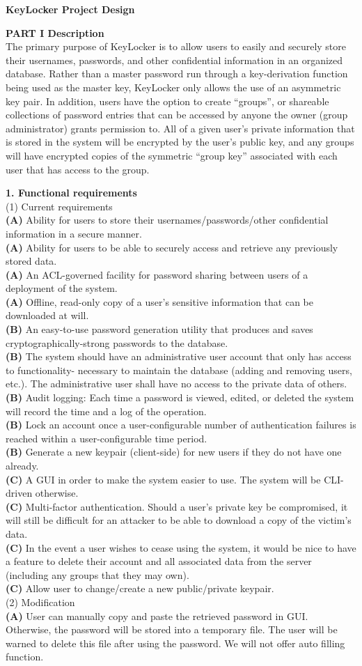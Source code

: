 \documentclass[11pt, letterpaper]{article}
\newcommand{\DesignSection}[1]
{\noindent\textbf{#1}\\}
\newcommand{\IndentBullet}[1]
{\indent\textbullet{} #1\\}
\begin{document}
\centerline{\textbf{KeyLocker Project Design}}
\smallskip

\DesignSection{PART I Description}
\noindent
The primary purpose of KeyLocker is to allow users to easily and securely store their usernames, passwords, and other confidential information in an organized database. Rather than a master password run through a key-derivation function being used as the master key, KeyLocker only allows the use of an asymmetric key pair. In addition, users have the option to create “groups”, or shareable collections of password entries that can be accessed by anyone the owner (group administrator) grants permission to. All of a given user's private information that is stored in the system will be encrypted by the user's public key, and any groups will have encrypted copies of the symmetric “group key” associated with each user that has access to the group.

\DesignSection{1. Functional requirements}
\smallskip
\noindent(1) Current requirements\\
\IndentBullet{\textbf{(A) }Ability for users to store their usernames/passwords/other confidential information in a secure manner.}
\IndentBullet{\textbf{(A) }Ability for users to be able to securely access and retrieve any previously stored data.}
\IndentBullet{\textbf{(A) }An ACL-governed facility for password sharing between users of a deployment of the system.}
\IndentBullet{\textbf{(A) }Offline, read-only copy of a user's sensitive information that can be downloaded at will.}
\IndentBullet{\textbf{(B) }An easy-to-use password generation utility that produces and saves cryptographically-strong passwords to the database.}
\IndentBullet{\textbf{(B) }The system should have an administrative user account that only has access to functionality- necessary to maintain the database (adding and removing users, etc.). The administrative user shall have no access to the private data of others.}
\IndentBullet{\textbf{(B) }Audit logging: Each time a password is viewed, edited, or deleted the system will record the time and a log of the operation.}
\IndentBullet{\textbf{(B) }Lock an account once a user-configurable number of authentication failures is reached within a user-configurable time period.}
\IndentBullet{\textbf{(B) }Generate a new keypair (client-side) for new users if they do not have one already.}
\IndentBullet{\textbf{(C) }A GUI in order to make the system easier to use. The system will be CLI-driven otherwise.}
\IndentBullet{\textbf{(C) }Multi-factor authentication. Should a user's private key be compromised, it will still be difficult for an attacker to be able to download a copy of the victim's data.}
\IndentBullet{\textbf{(C) }In the event a user wishes to cease using the system, it would be nice to have a feature to delete their account and all associated data from the server (including any groups that they may own).}
\IndentBullet{\textbf{(C) }Allow user to change/create a new public/private keypair.}
\smallskip
\noindent(2) Modification\\
\IndentBullet{\textbf{(A) }User can manually copy and paste the retrieved password in GUI. Otherwise, the password will be stored into a temporary file. The user will be warned to delete this file after using the password. We will not offer auto filling function.}
\end{document}

